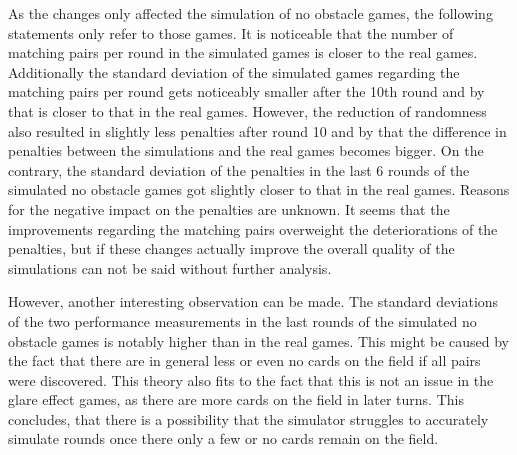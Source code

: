 As the changes only affected the simulation of no obstacle games, the following statements only refer to those games. It is noticeable that the number of matching pairs per round in the simulated games is closer to the real games. Additionally the standard deviation of the simulated games regarding the matching pairs per round gets noticeably smaller after the 10th round and by that is closer to that in the real games. However, the reduction of randomness also resulted in slightly less penalties after round 10 and by that the difference in penalties between the simulations and the real games becomes bigger. On the contrary, the standard deviation of the penalties in the last 6 rounds of the simulated no obstacle games got slightly closer to that in the real games. Reasons for the negative impact on the penalties are unknown. It seems that the improvements regarding the matching pairs overweight the deteriorations of the penalties, but if these changes actually improve the overall quality of the simulations can not be said without further analysis. 



However, another interesting observation can be made. The standard deviations of the two performance measurements in the last rounds of the simulated no obstacle games is notably higher than in the real games. This might be caused by the fact that there are in general less or even no cards on the field if all pairs were discovered. This theory also fits to the fact that this is not an issue in the glare effect games, as there are more cards on the field in later turns. This concludes, that there is a possibility that the simulator struggles to accurately simulate rounds once there only a few or no cards remain on the field. 

